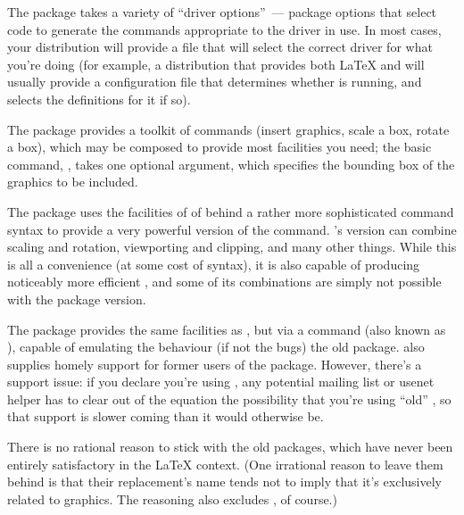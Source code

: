 The  package takes a variety of ``driver
options''~--- package options that select code to generate the
commands appropriate to the  driver in use.  In most cases,
your \AllTeX{} distribution will provide a  file
that will select the correct driver for what you're doing (for
example, a distribution that provides both \LaTeX{} and \PDFLaTeX{}
will usually provide a configuration file that determines whether
\PDFLaTeX{} is running, and selects the definitions for it if so).

The  package provides a toolkit of commands (insert
graphics, scale a box, rotate a box), which may be composed to provide
most facilities you need; the basic command, ,
takes one optional argument, which specifies  the bounding box of the
graphics to be included.

The  package uses the facilities of of
 behind a rather more sophisticated command syntax
to provide a very powerful version of the 
command.  's version can combine scaling and
rotation, viewporting and clipping, and many other things.  While this
is all a convenience (at some cost of syntax), it is also capable of
producing noticeably more efficient \PS{}, and some of its
combinations are simply not possible with the 
package version.

The  package provides the same facilities as
, but via a  command (also known as
), capable of emulating
the behaviour (if not the bugs) the old  package.
 also supplies homely support for former users of the
 package.  However, there's a support issue: if you
declare you're using , any potential mailing list or
usenet helper has to clear out of the equation the possibility that
you're using ``old'' , so that support is slower
coming than it would otherwise be.

There is no rational reason to stick with the old packages, which have
never been entirely satisfactory in the \LaTeX{} context. (One
irrational reason to leave them behind is that their replacement's
name tends not to imply that it's exclusively related to \PS{}
graphics.  The reasoning also excludes , of course.)

